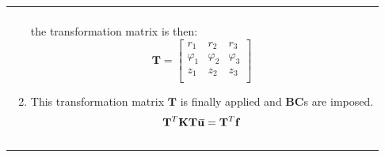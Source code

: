 \documentclass[10pt,b5paper,titlepage]{book}
\newcommand{\m}{\mathbf}
\newcommand{\closure}[2][3]{%
{}\mkern#1mu\overline{\mkern-#1mu#2}}
\newenvironment{bbox}[1][0.96]
{
    \begin{center}
        \begin{tabular}{|p{#1\textwidth}|}
            \hline\\
}
{
            \\\\\hline
        \end{tabular}
    \end{center}
}
\begin{document}
\begin{bbox}
\begin{enumerate}
            the transformation matrix is then:
            \begin{equation}
                \m{T} = \begin{bmatrix}
                    r_1 & r_2 & r_3 \\
                    \varphi_1 & \varphi_2 & \varphi_3 \\
                    z_1 & z_2 & z_3 \\
                \end{bmatrix}
            \end{equation}

        \item This transformation matrix $ \m{T} $ is finally applied and
            \textbf{BC}s are imposed.
            \begin{equation}
                \m{T}^T \m{K} \m{T} \m{\closure{u}} = \m{T}^T \m{f}
            \end{equation}

    \end{enumerate}

\end{bbox}
\end{document}
